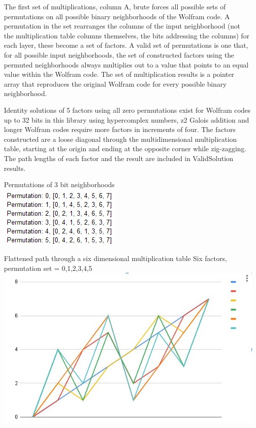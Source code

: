 \documentclass[11pt]{article}
\begin{document}
The first set of multiplications, column A, brute forces all possible sets of permutations on all possible binary neighborhoods of the Wolfram code. A permutation in the set rearranges the columns of the input neighborhood (not the multiplication table columns themselves, the bits addressing the columns) for each layer, these become a set of factors.  A valid set of permutations is one that, for all possible input neighborhoods, the set of constructed factors using the permuted neighborhoods always multiplies out to a value that points to an equal value within the Wolfram code. The set of multiplication results is a pointer array that reproduces the original Wolfram code for every possible binary neighborhood. 

Identity solutions of 5 factors using all zero permutations exist for Wolfram codes up to 32 bits in this library using hypercomplex numbers, z2 Galois addition and longer Wolfram codes require more factors in increments of four. The factors constructed are a loose diagonal through the multidimensional multiplication table, starting at the origin and ending at the opposite corner while zig-zagging. The path lengths of each factor and the result are included in ValidSolution results.

\begin{center}
Permutations of 3 bit neighborhoods\\
\includegraphics{bitPermutations.jpg}

Flattened path through a six dimensional multiplication table
Six factors, permutation set = {0,1,2,3,4,5}\\
\includegraphics{flattenedSixCube.jpg}
\end{center}
\end{document}
